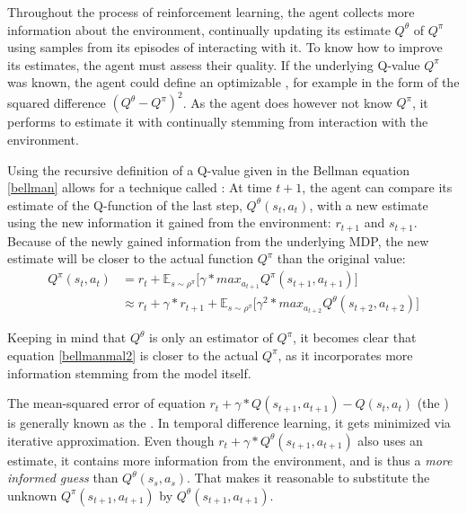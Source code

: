 Throughout the process of reinforcement learning, the agent collects more information about the environment, continually updating its estimate $Q^\theta$ of $Q^\pi$ using samples from its episodes of interacting with it. To know how to improve its estimates, the agent must assess their quality. If the underlying Q-value $Q^\pi$ was known, the agent could define an optimizable , for example in the form of the squared difference $(Q^\theta - Q^\pi)^2$. As the agent does however not know $Q^\pi$, it performs  to estimate it with continually  stemming from interaction with the environment.


\noindent Using the recursive definition of a Q-value given in the Bellman equation \ref{bellman} allows for a technique called \cite{sutton_learning_1988}: At time $t+1$, the agent can compare its estimate of the Q-function of the last step, $Q^\theta(s_t, a_t)$, with a new estimate using the new information it gained from the environment: $r_{t+1}$ and $s_{t+1}$.  Because of the newly gained information from the underlying MDP, the new estimate will be closer to the actual function $Q^\pi$ than the original value:
\begin{align} 
	Q^\pi(s_t,a_t) &= r_t + \mathds{E}_{s\sim\rho^\pi} \big[ \gamma * max_{a_{t+1}} Q^\pi(s_{t+1},a_{t+1})  \big]\\
	                     &\approx r_t + \gamma * r_{t+1} + \mathds{E}_{s\sim\rho^\pi} \big[ \gamma^2 * max_{a_{t+2}} Q^\theta(s_{t+2},a_{t+2})  \big] \label{bellmanmal2}
\end{align}


Keeping in mind that $Q^\theta$ is only an estimator of $Q^\pi$, it becomes clear that equation \ref{bellmanmal2} is closer to the actual $Q^\pi$, as it incorporates more information stemming from the model itself. 

The mean-squared error of equation $r_t + \gamma * Q(s_{t+1},a_{t+1}) - Q(s_t,a_t)$ (the ) is generally known as the . In temporal difference learning, it gets minimized via iterative approximation. Even though $r_t + \gamma * Q^\theta(s_{t+1},a_{t+1})$ also uses an estimate, it contains more information from the environment, and is thus a \textit{more informed guess} than $Q^\theta(s_s,a_s)$. That makes it reasonable to substitute the unknown $Q^\pi(s_{t+1},a_{t+1})$ by $Q^\theta(s_{t+1},a_{t+1})$.

